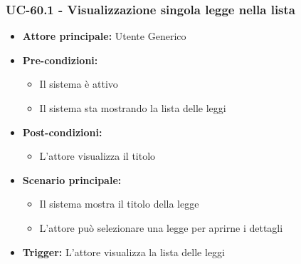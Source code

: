 \documentclass[a4paper,12pt]{article}
\begin{document}
\subsubsection{UC-60.1 - Visualizzazione singola legge nella lista} \label{subsec:UC-60.1}
\begin{itemize}
    \item \textbf{Attore principale:} Utente Generico
    \item \textbf{Pre-condizioni:} 
    \begin{itemize}
        \item Il sistema è attivo
        \item Il sistema sta mostrando la lista delle leggi
    \end{itemize}
    \item \textbf{Post-condizioni:}
    \begin{itemize}
        \item L'attore visualizza il titolo
    \end{itemize}
    \item \textbf{Scenario principale:} 
    \begin{itemize}
        \item Il sistema mostra il titolo della legge
        \item L'attore può selezionare una legge per aprirne i dettagli
    \end{itemize}
    \item \textbf{Trigger:} L'attore visualizza la lista delle leggi
\end{itemize}
\end{document}
